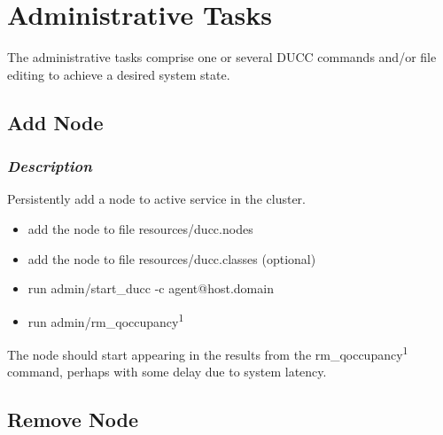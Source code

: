 % 
% 
% 
% 

\section{Administrative Tasks}

   The administrative tasks comprise one or several DUCC commands 
   and/or file editing to achieve a desired system state.

\subsection{Add Node}
\label{subsec:admin.add-node}

	\subsubsection{{\em Description}}
    Persistently add a node to active service in the cluster.
    \begin{itemize}
      \item add the node to file resources/ducc.nodes
      \item add the node to file resources/ducc.classes (optional)
      \item run admin/start\_ducc -c agent@host.domain
      \item run admin/rm\_qoccupancy\textsuperscript{1}
    \end{itemize}

	The node should start appearing in the results from the
	rm\_qoccupancy\textsuperscript{1} command, perhaps with 
	some delay due to system latency.
	
\subsection{Remove Node}
\label{subsec:admin.remove-node}

